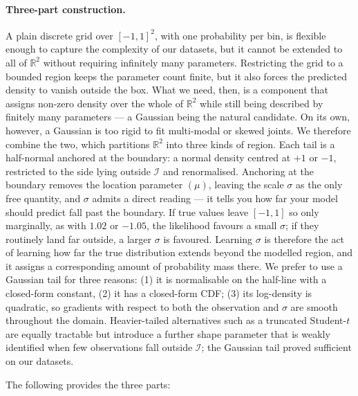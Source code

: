 \documentclass[11pt]{article}
\theoremstyle{plain}
\theoremstyle{definition}
\theoremstyle{remark}
\begin{document}
\paragraph{Three-part construction.}
A plain discrete grid over $[-1,1]^2$, with one probability per bin, is
flexible enough to capture the complexity of our datasets, but it cannot be
extended to all of $\mathbb{R}^2$ without requiring infinitely many
parameters. Restricting the grid to a bounded region keeps the parameter
count finite, but it also forces the predicted density to vanish outside the
box. What we need, then, is a component that assigns non-zero density over
the whole of $\mathbb{R}^2$ while still being described by finitely many
parameters --- a Gaussian being the natural candidate. On its own, however, a
Gaussian is too rigid to fit multi-modal or skewed joints. We therefore combine the two, which partitions $\mathbb{R}^2$ into three
kinds of region. Each tail is a half-normal anchored at the boundary: a normal density centred at $+1$ or $-1$, restricted to the side lying outside $\mathcal{I}$ and renormalised. Anchoring at the boundary removes
the location parameter $(\mu)$, leaving the scale $\sigma$ as the only free quantity, and $\sigma$ admits a direct reading --- it tells you how far your model should predict fall past the boundary. If true values leave $[-1,1]$ so only marginally, as with $1.02$ or $-1.05$, the
likelihood favours a small $\sigma$; if they routinely land far outside,
a larger $\sigma$ is favoured. Learning $\sigma$ is therefore  the act of learning how far the true distribution extends beyond the modelled
region, and it assigns a corresponding amount of probability mass there. We prefer to use a Gaussian tail for three reasons: (1) it is normalisable on the half-line with a closed-form constant, (2) it has a closed-form CDF; (3) its log-density is quadratic, so gradients with respect to both the observation and $\sigma$ are smooth throughout the domain. Heavier-tailed alternatives such as a truncated Student-$t$ are equally tractable but introduce a further shape parameter that is weakly identified when few observations fall outside $\mathcal{I}$; the Gaussian tail proved sufficient on our
datasets. 

The following provides the three parts:
 
\end{document}
